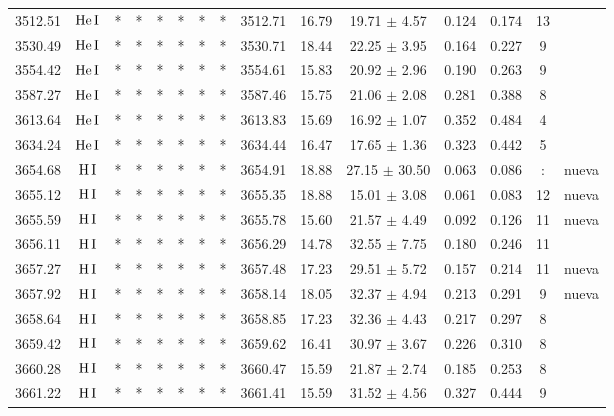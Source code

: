 \documentclass{article}
\begin{document}
\begin{table*}
\begin{adjustbox}{width=\textwidth}
\begin{tabular}{ccccccccccccccc}
3512.51 & $\mbox{He}\thinspace \mbox{I}$ & * & * & * & * & * & * & 3512.71 & 16.79 & 19.71 $\pm$ 4.57 & 0.124 & 0.174 & 13 &  \\
3530.49 & $\mbox{He}\thinspace \mbox{I}$ & * & * & * & * & * & * & 3530.71 & 18.44 & 22.25 $\pm$ 3.95 & 0.164 & 0.227 & 9 &  \\
3554.42 & $\mbox{He}\thinspace \mbox{I}$ & * & * & * & * & * & * & 3554.61 & 15.83 & 20.92 $\pm$ 2.96 & 0.190 & 0.263 & 9 &  \\
3587.27 & $\mbox{He}\thinspace \mbox{I}$ & * & * & * & * & * & * & 3587.46 & 15.75 & 21.06 $\pm$ 2.08 & 0.281 & 0.388 & 8 &  \\
3613.64 & $\mbox{He}\thinspace \mbox{I}$ & * & * & * & * & * & * & 3613.83 & 15.69 & 16.92 $\pm$ 1.07 & 0.352 & 0.484 & 4 &  \\
3634.24 & $\mbox{He}\thinspace \mbox{I}$ & * & * & * & * & * & * & 3634.44 & 16.47 & 17.65 $\pm$ 1.36 & 0.323 & 0.442 & 5 &  \\
3654.68 & $\mbox{H}\thinspace \mbox{I}$ & * & * & * & * & * & * & 3654.91 & 18.88 & 27.15 $\pm$ 30.50 & 0.063 & 0.086 & : &  nueva \\
3655.12 & $\mbox{H}\thinspace \mbox{I}$ & * & * & * & * & * & * & 3655.35 & 18.88 & 15.01 $\pm$ 3.08 & 0.061 & 0.083 & 12 &  nueva \\
3655.59 & $\mbox{H}\thinspace \mbox{I}$ & * & * & * & * & * & * & 3655.78 & 15.60 & 21.57 $\pm$ 4.49 & 0.092 & 0.126 & 11 &  nueva \\
3656.11 & $\mbox{H}\thinspace \mbox{I}$ & * & * & * & * & * & * & 3656.29 & 14.78 & 32.55 $\pm$ 7.75 & 0.180 & 0.246 & 11 &  \\
3657.27 & $\mbox{H}\thinspace \mbox{I}$ & * & * & * & * & * & * & 3657.48 & 17.23 & 29.51 $\pm$ 5.72 & 0.157 & 0.214 & 11 &  nueva \\
3657.92 & $\mbox{H}\thinspace \mbox{I}$ & * & * & * & * & * & * & 3658.14 & 18.05 & 32.37 $\pm$ 4.94 & 0.213 & 0.291 & 9 &  nueva \\
3658.64 & $\mbox{H}\thinspace \mbox{I}$ & * & * & * & * & * & * & 3658.85 & 17.23 & 32.36 $\pm$ 4.43 & 0.217 & 0.297 & 8 &  \\
3659.42 & $\mbox{H}\thinspace \mbox{I}$ & * & * & * & * & * & * & 3659.62 & 16.41 & 30.97 $\pm$ 3.67 & 0.226 & 0.310 & 8 &  \\
3660.28 & $\mbox{H}\thinspace \mbox{I}$ & * & * & * & * & * & * & 3660.47 & 15.59 & 21.87 $\pm$ 2.74 & 0.185 & 0.253 & 8 &  \\
3661.22 & $\mbox{H}\thinspace \mbox{I}$ & * & * & * & * & * & * & 3661.41 & 15.59 & 31.52 $\pm$ 4.56 & 0.327 & 0.444 & 9 &  \\

\end{tabular}
\end{adjustbox}
\end{table*}
\end{document}
